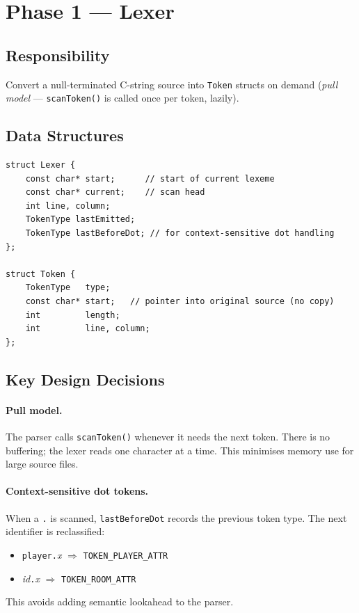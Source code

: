 \documentclass[12pt, a4paper]{article}
\begin{document}
\section{Phase 1 --- Lexer}

\subsection{Responsibility}
Convert a null-terminated C-string source into \texttt{Token} structs on demand
(\emph{pull model} --- \texttt{scanToken()} is called once per token, lazily).

\subsection{Data Structures}

\begin{lstlisting}[style=cpp, caption={Lexer state and Token struct}]
struct Lexer {
    const char* start;      // start of current lexeme
    const char* current;    // scan head
    int line, column;
    TokenType lastEmitted;
    TokenType lastBeforeDot; // for context-sensitive dot handling
};

struct Token {
    TokenType   type;
    const char* start;   // pointer into original source (no copy)
    int         length;
    int         line, column;
};
\end{lstlisting}

\subsection{Key Design Decisions}

\paragraph{Pull model.}
The parser calls \texttt{scanToken()} whenever it needs the next token.
There is no buffering; the lexer reads one character at a time.
This minimises memory use for large source files.

\paragraph{Context-sensitive dot tokens.}
When a \texttt{.} is scanned, \texttt{lastBeforeDot} records the previous token type.
The next identifier is reclassified:
\begin{itemize}
  \item \texttt{player.}\textit{x} $\Rightarrow$ \texttt{TOKEN\_PLAYER\_ATTR}
  \item \textit{id}\texttt{.}\textit{x} $\Rightarrow$ \texttt{TOKEN\_ROOM\_ATTR}
\end{itemize}
This avoids adding semantic lookahead to the parser.
\end{document}
